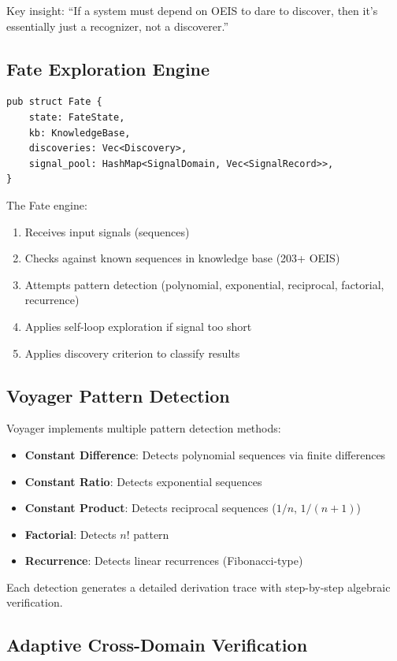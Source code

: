 \documentclass[11pt,a4paper]{article}
\begin{document}
Key insight: ``If a system must depend on OEIS to dare to discover, then it's essentially just a recognizer, not a discoverer.''

\subsection{Fate Exploration Engine}

\begin{verbatim}
pub struct Fate {
    state: FateState,
    kb: KnowledgeBase,
    discoveries: Vec<Discovery>,
    signal_pool: HashMap<SignalDomain, Vec<SignalRecord>>,
}
\end{verbatim}

The Fate engine:
\begin{enumerate}
    \item Receives input signals (sequences)
    \item Checks against known sequences in knowledge base (203+ OEIS)
    \item Attempts pattern detection (polynomial, exponential, reciprocal, factorial, recurrence)
    \item Applies self-loop exploration if signal too short
    \item Applies discovery criterion to classify results
\end{enumerate}

\subsection{Voyager Pattern Detection}

Voyager implements multiple pattern detection methods:
\begin{itemize}
    \item \textbf{Constant Difference}: Detects polynomial sequences via finite differences
    \item \textbf{Constant Ratio}: Detects exponential sequences
    \item \textbf{Constant Product}: Detects reciprocal sequences ($1/n$, $1/(n+1)$)
    \item \textbf{Factorial}: Detects $n!$ pattern
    \item \textbf{Recurrence}: Detects linear recurrences (Fibonacci-type)
\end{itemize}

Each detection generates a detailed derivation trace with step-by-step algebraic verification.

\subsection{Adaptive Cross-Domain Verification}
\end{document}
